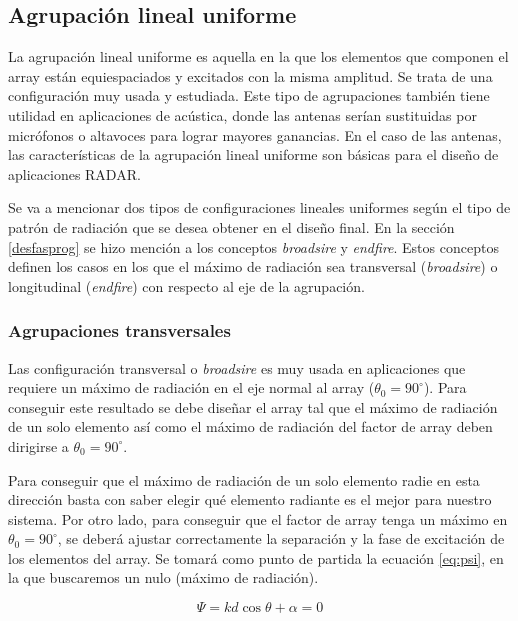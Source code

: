 \subsection{Agrupación lineal uniforme}
\par La agrupación lineal uniforme es aquella en la que los elementos que componen el array están equiespaciados y excitados con la misma amplitud. Se trata de una configuración muy usada y estudiada. Este tipo de agrupaciones también tiene utilidad en aplicaciones de acústica, donde las antenas serían sustituidas por micrófonos o altavoces para lograr mayores ganancias. En el caso de las antenas, las características de la agrupación lineal uniforme son básicas para el diseño de aplicaciones RADAR. 
\\
\par Se va a mencionar dos tipos de configuraciones lineales uniformes según el tipo de patrón de radiación que se desea obtener en el diseño final. En la sección \ref{desfasprog} se hizo mención a los conceptos \textit{broadsire} y \textit{endfire}. Estos conceptos definen los casos en los que el máximo de radiación sea transversal (\textit{broadsire}) o longitudinal (\textit{endfire}) con respecto al eje de la agrupación. \cite{Cardama2002}

\subsubsection{Agrupaciones transversales}

\par Las configuración transversal o \textit{broadsire} es muy usada en aplicaciones que requiere un máximo de radiación en el eje normal al array ($\theta_{0}=90^{\circ}$). Para conseguir este resultado se debe diseñar el array tal que el máximo de radiación de un solo elemento así como el máximo de radiación del factor de array deben dirigirse a $\theta_{0}=90^{\circ}$. \cite{Balanis2015} 
\\
\par Para conseguir que el máximo de radiación de un solo elemento radie en esta dirección basta con saber elegir qué elemento radiante es el mejor para nuestro sistema. Por otro lado, para conseguir que el factor de array tenga un máximo en $\theta_{0}=90^{\circ}$, se deberá ajustar correctamente la separación y la fase de excitación de los elementos del array. Se tomará como punto de partida la ecuación \ref{eq:psi}, en la que buscaremos un nulo (máximo de radiación).  

\begin{equation}
	\Psi=kd\cos\theta+\alpha=0
	\label{eq:nulo}
\end{equation}

